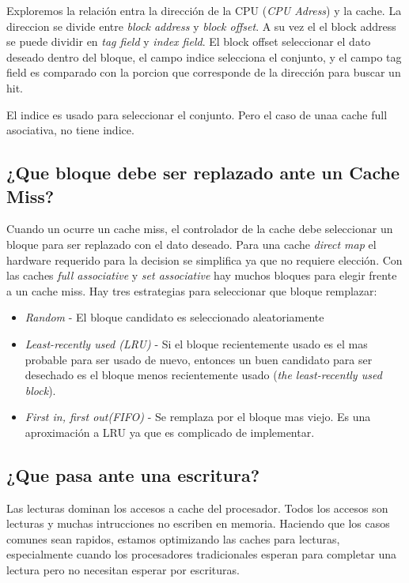 \documentclass{article}
\begin{document}
Exploremos la relación entra la dirección de la CPU (\textit{CPU Adress}) y la cache. La direccion se divide entre \textit{block address} y \textit{block offset}.
A su vez el el block address se puede dividir en \textit{tag field} y \textit{index field}. 
El block offset seleccionar el dato deseado dentro del bloque, el campo indice selecciona el conjunto, y el campo tag field es comparado con la porcion que corresponde de la dirección para buscar un hit. 

El indice es usado para seleccionar el conjunto. Pero el caso de unaa cache full asociativa, no tiene indice.

\subsection{¿Que bloque debe ser replazado ante un Cache Miss?}

Cuando un ocurre un cache miss, el controlador de la cache debe seleccionar un bloque para ser replazado con el dato deseado.
Para una cache \textit{direct map} el hardware requerido para la decision se simplifica ya que no requiere elección.
Con las caches \textit{full associative} y \textit{set associative} hay muchos bloques para elegir frente a un cache miss.
Hay tres estrategias para seleccionar que bloque remplazar:


\begin{itemize} 
    \item \textit{Random} - El bloque candidato es seleccionado aleatoriamente
    \item \textit{Least-recently used (LRU)} - Si el bloque recientemente usado es el mas probable para ser usado de nuevo, entonces un buen candidato para ser desechado es el bloque menos recientemente usado (\textit{the least-recently used block}).
    \item \textit{First in, first out(FIFO)} - Se remplaza por el bloque mas viejo. Es una aproximación a LRU ya que es complicado de implementar.
\end{itemize}

\subsection{¿Que pasa ante una escritura?}

Las lecturas dominan los accesos a cache del procesador. Todos los accesos son lecturas y muchas intrucciones no escriben en memoria. 
Haciendo que los casos comunes sean rapidos, estamos optimizando las caches para lecturas, especialmente cuando los procesadores
tradicionales esperan para completar una lectura pero no necesitan esperar por escrituras.
\end{document}
